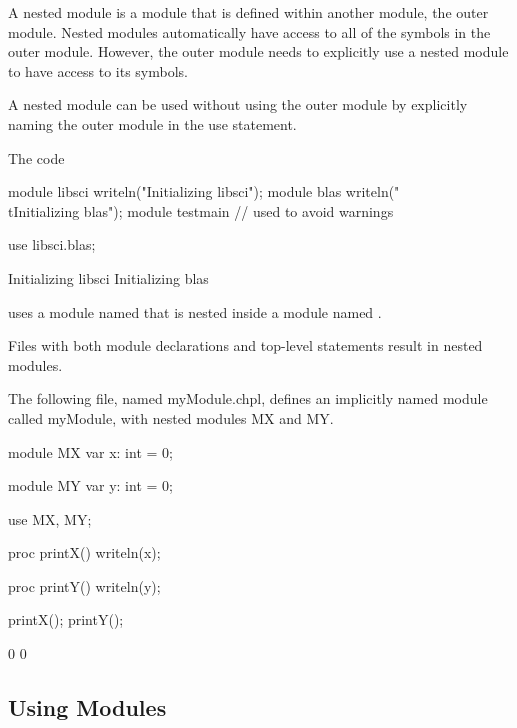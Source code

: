 A nested module is a module that is defined within another module, the
outer module.  Nested modules automatically have access to all of the
symbols in the outer module.  However, the outer module needs to
explicitly use a nested module to have access to its symbols.

A nested module can be used without using the outer module by
explicitly naming the outer module in the use statement.
\begin{example}
The code
\begin{chapelpre}
module libsci {
  writeln("Initializing libsci");
  module blas {
    writeln("\\tInitializing blas");
  }
}
module testmain { // used to avoid warnings
}
\end{chapelpre}
\begin{chapel}
use libsci.blas;
\end{chapel}
\begin{chapeloutput}
Initializing libsci
	Initializing blas
\end{chapeloutput}
uses a module named  that is nested inside a module
named .
\end{example}

Files with both module declarations and top-level statements result in
nested modules.

\begin{example}
The following file, named myModule.chpl, defines an
implicitly named module called myModule, with nested modules
MX and MY.
\begin{chapelpre}
\end{chapelpre}
\begin{chapel}
module MX {
  var x: int = 0;
}

module MY {
  var y: int = 0;
}

use MX, MY;

proc printX() {
  writeln(x);
}

proc printY() {
  writeln(y);
}
\end{chapel}
\begin{chapelpost}
printX();
printY();
\end{chapelpost}
\begin{chapeloutput}
0
0
\end{chapeloutput}
\end{example}


\subsection{Using Modules}
\label{Using_Modules}

